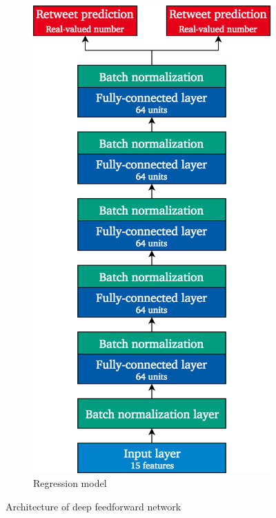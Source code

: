 \begin{figure}[h]
\begin{subfigure}{.4\textwidth}
  \includegraphics[width=.95\linewidth]{img/deep_1_regr_architecture}
  \caption{Regression model}
  \label{fig:deep1_architecture_2}
\end{subfigure}
\caption{Architecture of deep feedforward network}
\label{fig:deep1_architecture}
\end{figure}



